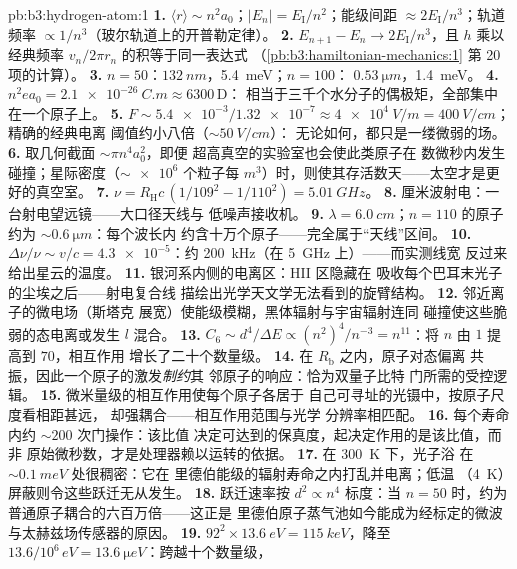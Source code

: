 \begin{solution}{pb:b3:hydrogen-atom:1}
\textbf{1.} $\langle r\rangle \sim n^2a_0$；$|E_n| =
E_{\text{I}}/n^2$；能级间距 $\approx 2E_{\text{I}}/n^3$；轨道
频率 $\propto 1/n^3$（玻尔轨道上的开普勒定律）。
\textbf{2.} $E_{n+1} - E_n \to 2E_{\text{I}}/n^3$，且 $h$ 乘以
经典频率 $v_n/2\pi r_n$ 的积等于同一表达式
（\cref{pb:b3:hamiltonian-mechanics:1} 第 20 项的计算）。
\textbf{3.} $n = 50$：$\qty{132}{nm}$，\qty{5.4}{meV}；$n = 100$：
$\qty{0.53}{\micro m}$，\qty{1.4}{meV}。
\textbf{4.} $n^2ea_0 = \qty{2.1e-26}{C.m} \approx 6300\,\text{D}$：
相当于三千个水分子的偶极矩，全部集中在一个原子上。
\textbf{5.} $F \sim \num{5.4e-3}/\num{1.32e-7} \approx
\qty{4e4}{V/m} = \qty{400}{V/cm}$；精确的经典电离
阈值约小八倍（$\sim\qty{50}{V/cm}$）：
无论如何，都只是一缕微弱的场。
\textbf{6.} 取几何截面 $\sim\pi n^4a_0^2$，即便
超高真空的实验室也会使此类原子在
数微秒内发生碰撞；星际密度（$\sim\num{e6}$ 个粒子每
$\unit{m^3}$）时，则使其存活数天——太空才是更好的真空室。
\textbf{7.} $\nu = R_{\text{H}}c\,(1/109^2 - 1/110^2) =
\qty{5.01}{GHz}$。
\textbf{8.} 厘米波射电：一台射电望远镜——大口径天线与
低噪声接收机。
\textbf{9.} $\lambda = \qty{6.0}{cm}$；$n = 110$ 的原子
约为 $\sim\qty{0.6}{\micro m}$：每个波长内
约含十万个原子——完全属于“天线”区间。
\textbf{10.} $\Delta\nu/\nu \sim v/c = \num{4.3e-5}$：约
\qty{200}{kHz}（在 \qty{5}{GHz} 上）——而实测线宽
反过来给出星云的温度。
\textbf{11.} 银河系内侧的电离区：HII 区隐藏在
吸收每个巴耳末光子的尘埃之后——射电复合线
描绘出光学天文学无法看到的旋臂结构。
\textbf{12.} 邻近离子的微电场（斯塔克
展宽）使能级模糊，黑体辐射与宇宙辐射连同
碰撞使这些脆弱的态电离或发生 $l$ 混合。
\textbf{13.} $C_6 \sim d^4/\Delta E \propto (n^2)^4/n^{-3} =
n^{11}$：将 $n$ 由 $1$ 提高到 $70$，相互作用
增长了二十个数量级。
\textbf{14.} 在 $R_{\text{b}}$ 之内，原子对态偏离
共振，因此一个原子的激发\emph{制约}其
邻原子的响应：恰为双量子比特
门所需的受控逻辑。
\textbf{15.} 微米量级的相互作用使每个原子各居于
自己可寻址的光镊中，按原子尺度看相距甚远，
却强耦合——相互作用范围与光学
分辨率相匹配。
\textbf{16.} 每个寿命内约 $\sim 200$ 次门操作：该比值
决定可达到的保真度，起决定作用的是该比值，而非
原始微秒数，才是处理器赖以运转的依据。
\textbf{17.} 在 \qty{300}{K} 下，光子浴
在 $\sim\qty{0.1}{meV}$ 处很稠密：它在
里德伯能级的辐射寿命之内打乱并电离；低温
（\qty{4}{K}）屏蔽则令这些跃迁无从发生。
\textbf{18.} 跃迁速率按 $d^2 \propto n^4$ 标度：当 $n =
50$ 时，约为普通原子耦合的六百万倍——这正是
里德伯原子蒸气池如今能成为经标定的微波
与太赫兹场传感器的原因。
\textbf{19.} $92^2 \times \qty{13.6}{eV} = \qty{115}{keV}$，降至
$13.6/10^6\,\unit{eV} = \qty{13.6}{\micro eV}$：跨越十个数量级，

\end{solution}
